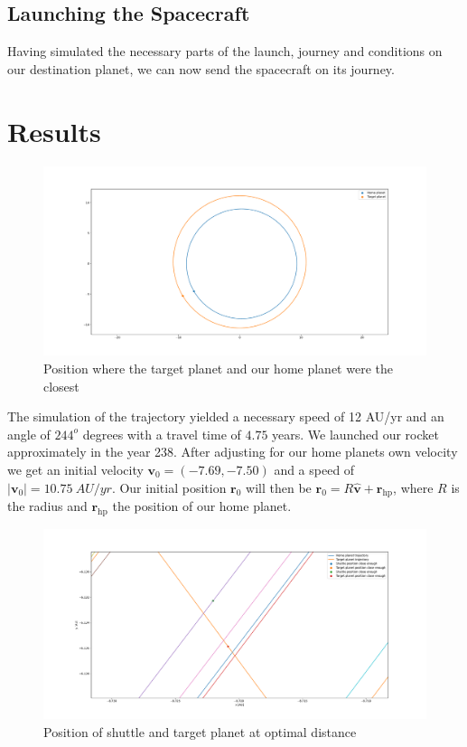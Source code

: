 \documentclass[reprint,english,notitlepage]{revtex4-2}
\begin{document}
\subsection{Launching the Spacecraft}\label{subsec:launching-the-spacecraft}
    Having simulated the necessary parts of the launch, journey and conditions on our destination planet, we can now send the spacecraft on its journey.

\newpage
\section{Results} \label{sec: results}
\begin{figure}[h!]
  \centering
  \includegraphics[scale = .125]{Figures/closest_orbit.pdf}
  \caption{Position where the target planet and our home planet were the closest}
  \label{fig: closest orbit}
\end{figure}

The simulation of the trajectory yielded a necessary speed of 12 AU/yr and an angle of $ 244 ^{o} $ degrees with a travel time of $ 4.75 $ years. We launched our rocket approximately in the year 238. After adjusting for our home planets own velocity we get an initial velocity $ \mathbf{v}_0 = (-7.69, -7.50) $ and a speed of $ \left\vert \mathbf{v}_0 \right\vert = 10.75 \  AU / yr$. Our initial position $ \mathbf{r}_0 $ will then be $ \mathbf{r}_0 = R \hat{\mathbf{v}} + \mathbf{r}_{\text{hp}} $, where $ R $ is the radius and $ \mathbf{r}_{\text{hp}} $ the position of our home planet. 
\begin{figure}[h!]
  \centering
  \includegraphics[scale = .125]{Figures/good_enough_distance.pdf}
  \caption{Position of shuttle and target planet at optimal distance}
  \label{fig: good enough distance}
\end{figure} 
\end{document}
